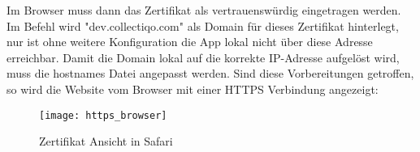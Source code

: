 Im Browser muss dann das Zertifikat als vertrauenswürdig eingetragen werden.
Im Befehl wird "dev.collectiqo.com" als Domain für dieses Zertifikat hinterlegt, nur ist ohne weitere Konfiguration die App lokal nicht über diese Adresse erreichbar.
Damit die Domain lokal auf die korrekte IP-Adresse aufgelöst wird, muss die hostnames Datei angepasst werden.
Sind diese Vorbereitungen getroffen, so wird die Website vom Browser mit einer HTTPS Verbindung angezeigt:

\begin{figure}[h]
    \centering
    \texttt{[image: https\_browser]}
    \caption{Zertifikat Ansicht in Safari}
    \label{fig:https_browser}
\end{figure}